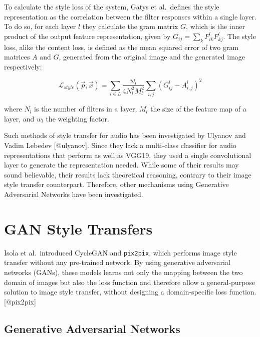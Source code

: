 \documentclass[12pt,a4paper,]{report}
\begin{document}
To calculate the style loss of the system, Gatys et al.~defines the
style representation as the correlation between the filter responses
within a single layer. To do so, for each layer \(l\) they calculate the
gram matrix \(G\), which is the inner product of the output feature
representation, given by \(G_{ij} = \sum_{k} F^l_{ik} F^l_{kj}\). The
style loss, alike the content loss, is defined as the mean squared error
of two gram matrices \(A\) and \(G\), generated from the original image
and the generated image respectively:

\begin{equation}
    \mathcal{L}_{style}(\vec{p}, \vec{x}) =  \sum_{l \in L} \frac{w_l}{4 N_l^2 M_l^2} \sum_{i, j} (G^l_{ij} - A^l_{i, j})^2
\end{equation}

where \(N_l\) is the number of filters in a layer, \(M_l\) the size of
the feature map of a layer, and \(w_l\) the weighting factor.

Such methods of style transfer for audio has been investigated by
Ulyanov and Vadim Lebedev {[}@ulyanov{]}. Since they lack a multi-class
classifier for audio representations that perform as well as VGG19, they
used a single convolutional layer to generate the representation needed.
While some of their results may sound believable, their results lack
theoretical reasoning, contrary to their image style transfer
counterpart. Therefore, other mechanisms using Generative Adversarial
Networks have been investigated.

\hypertarget{gan-style-transfers}{%
\section{GAN Style Transfers}\label{gan-style-transfers}}

Isola et al.~introduced CycleGAN and \texttt{pix2pix}, which performs
image style transfer without any pre-trained network. By using
generative adversarial networks (GANs), these models learns not only the
mapping between the two domain of images but also the loss function and
therefore allow a general-purpose solution to image style transfer,
without designing a domain-specific loss function. {[}@pix2pix{]}

\hypertarget{generative-adversarial-networks}{%
\subsection{Generative Adversarial
Networks}\label{generative-adversarial-networks}}
\end{document}
